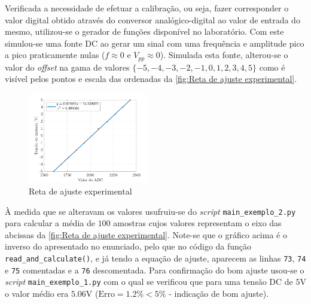 Verificada a necessidade de efetuar a calibração, ou seja, fazer corresponder o valor digital obtido através do conversor analógico-digital ao valor de entrada do mesmo, utilizou-se o gerador de funções disponível no laboratório. Com este simulou-se uma fonte DC ao gerar um sinal com uma frequência e amplitude pico a pico praticamente nulas ($f\approx0$ e $V_{pp}\approx0$). Simulada esta fonte, alterou-se o valor do \textit{offset} na gama de valores $\{-5,-4,-3,-2,-1,0,1,2,3,4,5\}$ como é visível pelos pontos e escala das ordenadas da \autoref{fig:Reta de ajuste experimental}. 

\begin{figure}[H]
    \centering
    \includegraphics[width=0.47\textwidth]{Imagens/Testes no laboratório/Ajuste experimental/Calibração experimental.png}
    \captionsetup{justification=centering}
    \caption{Reta de ajuste experimental}
    \label{fig:Reta de ajuste experimental}
\end{figure}

À medida que se alteravam os valores usufruiu-se do \textit{script} \texttt{main\_exemplo\_2.py} para calcular a média de $100$ amostras cujos valores representam o eixo das abcissas da \autoref{fig:Reta de ajuste experimental}. Note-se que o gráfico acima é o inverso do apresentado no enunciado, pelo que no código da função \texttt{read\_and\_calculate()}, e já tendo a equação de ajuste, aparecem as linhas \texttt{73}, \texttt{74} e \texttt{75} comentadas e a \texttt{76} descomentada. Para confirmação do bom ajuste usou-se o \textit{script} \texttt{main\_exemplo\_1.py} com o qual se verificou que para uma tensão DC de $5$V o valor médio era $5.06$V ($\text{Erro}=1.2\%<5\%$ - indicação de bom ajuste).